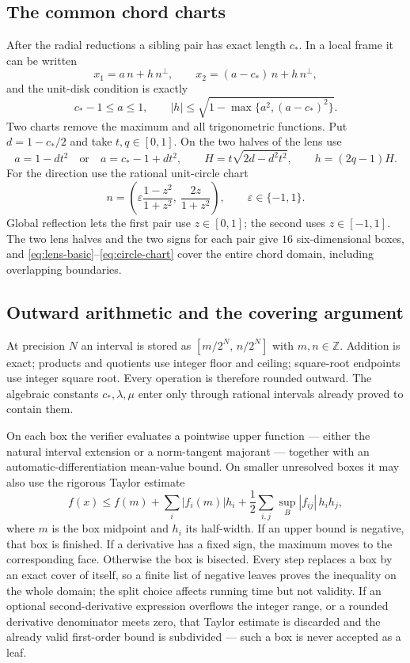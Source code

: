 \documentclass[11pt]{article}
\theoremstyle{plain}
\theoremstyle{definition}
\theoremstyle{remark}
\newcommand{\Z}{\mathbb Z}
\newcommand{\cstar}{c_{\!*}}
\begin{document}
\subsection{The common chord charts}

After the radial reductions a sibling pair has exact length $\cstar$.  In a
local frame it can be written
\begin{equation}\label{eq:lens-basic}
 x_1=a\,n+h\,n^\perp,\qquad x_2=(a-\cstar)\,n+h\,n^\perp,
\end{equation}
and the unit-disk condition is exactly
\[
 \cstar-1\le a\le1,\qquad |h|\le\sqrt{1-\max\{a^2,(a-\cstar)^2\}}.
\]
Two charts remove the maximum and all trigonometric functions.  Put
$d=1-\cstar/2$ and take $t,q\in[0,1]$.  On the two halves of the lens use
\[
 a=1-dt^2 \quad\text{or}\quad a=\cstar-1+dt^2,\qquad
 H=t\sqrt{2d-d^2t^2},\qquad h=(2q-1)H .
\]
For the direction use the rational unit-circle chart
\begin{equation}\label{eq:circle-chart}
 n=\left(\varepsilon\frac{1-z^2}{1+z^2},\ \frac{2z}{1+z^2}\right),
 \qquad\varepsilon\in\{-1,1\}.
\end{equation}
Global reflection lets the first pair use $z\in[0,1]$; the second uses
$z\in[-1,1]$.  The two lens halves and the two signs for each pair give
$16$ six-dimensional boxes, and
\eqref{eq:lens-basic}--\eqref{eq:circle-chart} cover the entire chord
domain, including overlapping boundaries.

\subsection{Outward arithmetic and the covering argument}

At precision $N$ an interval is stored as $[m/2^N,\,n/2^N]$ with
$m,n\in\Z$.  Addition is exact; products and quotients use integer floor
and ceiling; square-root endpoints use integer square root.  Every
operation is therefore rounded outward.  The algebraic constants
$\cstar,\lambda,\mu$ enter only through rational intervals already proved
to contain them.

On each box the verifier evaluates a pointwise upper function --- either the
natural interval extension or a norm-tangent majorant --- together with an
automatic-differentiation mean-value bound.  On smaller unresolved boxes it
may also use the rigorous Taylor estimate
\begin{equation}\label{eq:taylor-bound}
 f(x)\le f(m)+\sum_i|f_i(m)|h_i+\frac12\sum_{i,j}\sup_B|f_{ij}|\,h_ih_j,
\end{equation}
where $m$ is the box midpoint and $h_i$ its half-width.  If an upper bound
is negative, that box is finished.  If a derivative has a fixed sign, the
maximum moves to the corresponding face.  Otherwise the box is bisected.
Every step replaces a box by an exact cover of itself, so a finite list of
negative leaves proves the inequality on the whole domain; the split choice
affects running time but not validity.  If an optional second-derivative
expression overflows the integer range, or a rounded derivative denominator
meets zero, that Taylor estimate is discarded and the already valid
first-order bound is subdivided --- such a box is never accepted as a leaf.
\end{document}
